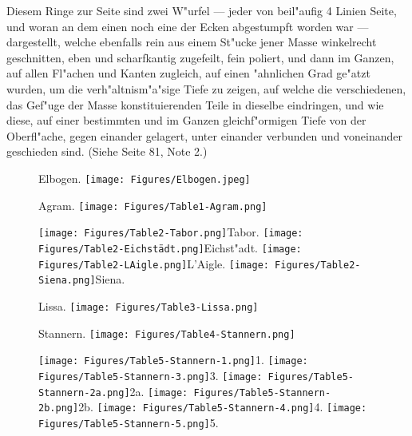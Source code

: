 \documentclass[a4paper, 11pt, oneside, german]{article}
\begin{document}
Diesem Ringe zur Seite sind zwei W"urfel --- jeder von beil"aufig 4 Linien Seite, und woran an dem einen noch eine der Ecken abgestumpft worden war --- dargestellt, welche ebenfalls rein aus einem St"ucke jener Masse winkelrecht geschnitten, eben und scharfkantig zugefeilt, fein poliert, und dann im Ganzen, auf allen Fl"achen und Kanten zugleich, auf einen "ahnlichen Grad ge"atzt wurden, um die verh"altnism"a"sige Tiefe zu zeigen, auf welche die verschiedenen, das Gef"uge der Masse konstituierenden Teile in dieselbe eindringen, und wie diese, auf einer bestimmten und im Ganzen gleichf"ormigen Tiefe von der Oberfl"ache, gegen einander gelagert, unter einander verbunden und voneinander geschieden sind. (Siehe Seite 81, Note 2.)
\clearpage
\setlength\intextsep{0pt}
\pagestyle{fancy}
\fancyhf{}
\cfoot{\thepage}
\begin{figure}[p]
\tiny Elbogen.
\texttt{[image: Figures/Elbogen.jpeg]}
\end{figure}
\clearpage
{}
\cfoot{\thepage}
\begin{figure}[p]
\tiny Agram.
\texttt{[image: Figures/Table1-Agram.png]}
\end{figure}
\clearpage
{}
\cfoot{\thepage}
\begin{figure}[p]
\texttt{[image: Figures/Table2-Tabor.png]}\tiny Tabor.
\texttt{[image: Figures/Table2-Eichstädt.png]}\tiny Eichst"adt.
\texttt{[image: Figures/Table2-LAigle.png]}\tiny L'Aigle.
\texttt{[image: Figures/Table2-Siena.png]}\tiny Siena.
\end{figure}
\clearpage
{}
\cfoot{\thepage}
\begin{figure}[p]
\tiny Lissa.
\texttt{[image: Figures/Table3-Lissa.png]}
\end{figure}
\clearpage
{}
\cfoot{\thepage}
\begin{figure}[p]
\tiny Stannern.
\texttt{[image: Figures/Table4-Stannern.png]}
\end{figure}
\clearpage
{}
\cfoot{\thepage}
\begin{figure}[p]
\texttt{[image: Figures/Table5-Stannern-1.png]}\tiny 1.
\texttt{[image: Figures/Table5-Stannern-3.png]}\tiny 3.
\texttt{[image: Figures/Table5-Stannern-2a.png]}\tiny 2a.
\texttt{[image: Figures/Table5-Stannern-2b.png]}\tiny 2b.
\texttt{[image: Figures/Table5-Stannern-4.png]}\tiny 4.
\texttt{[image: Figures/Table5-Stannern-5.png]}\tiny 5.
\end{figure}
\end{document}
